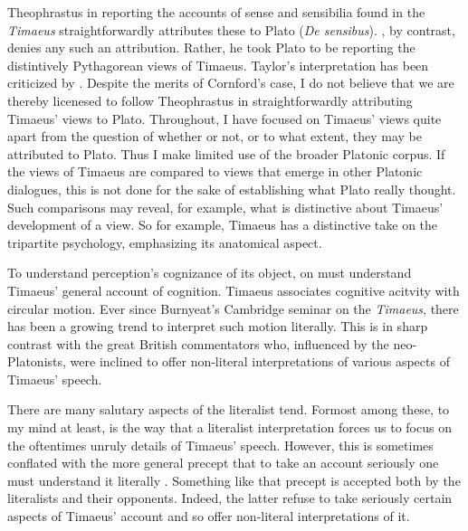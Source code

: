 Theophrastus in reporting the accounts of sense and sensibilia found in the \emph{Timaeus} straightforwardly attributes these to Plato (\emph{De sensibus}). \citet{Taylor:1928qb}, by contrast, denies any such an attribution. Rather, he took Plato to be reporting the distintively Pythagorean views of Timaeus. Taylor's interpretation has been criticized by \citet{Cornford:1935fk}. Despite the merits of Cornford's case, I do not believe that we are thereby licenesed to follow Theophrastus in straightforwardly attributing Timaeus' views to Plato. Throughout, I have focused on Timaeus' views quite apart from the question of whether or not, or to what extent, they may be attributed to Plato. Thus I make limited use of the broader Platonic corpus. If the views of Timaeus are compared to views that emerge in other Platonic dialogues, this is not done for the sake of establishing what Plato really thought. Such comparisons may reveal, for example, what is distinctive about Timaeus' development of a view. So for example, Timaeus has a distinctive take on the tripartite psychology, emphasizing its anatomical aspect.

To understand perception's cognizance of its object, on must understand Timaeus' general account of cognition. Timaeus associates cognitive acitvity with circular motion. Ever since Burnyeat's Cambridge seminar on the \emph{Timaeus}, there has been a growing trend to interpret such motion literally. This is in sharp contrast with the great British commentators who, influenced by the neo-Platonists, were inclined to offer non-literal interpretations of various aspects of Timaeus' speech. 

There are many salutary aspects of the literalist tend. Formost among these, to my mind at least, is the way that a literalist interpretation forces us to focus on the oftentimes unruly details of Timaeus' speech. However, this is sometimes conflated with the more general precept that to take an account seriously one must understand it literally \citep[see][7]{Broadie:2012vl}. Something like that precept is accepted both by the literalists and their opponents. Indeed, the latter refuse to take seriously certain aspects of Timaeus' account and so offer non-literal interpretations of it.

